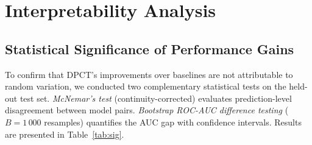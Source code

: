 \documentclass[conference,12pt]{IEEEtran}
\newcommand{\dpct}{\textsc{DPCT}}
\newcommand{\tab}[1]{Table~\ref{#1}}
\begin{document}
\begin{table}[!t]
  \centering
  \caption{Ablation Study on DPCT Architectural Components (5-Fold CV Mean)}
  \label{tab:ablation}
  \small
  \renewcommand{\arraystretch}{1.1}
\end{table}

\section{\textbf{Interpretability Analysis}}
\label{sec:interp}

\subsection{\textbf{Statistical Significance of Performance Gains}}
\label{sec:interp:sig}

To confirm that \dpct{}'s improvements over baselines are not attributable to
random variation, we conducted two complementary statistical tests on the
held-out test set.
\emph{McNemar's test} (continuity-corrected) evaluates prediction-level
disagreement between model pairs.
\emph{Bootstrap ROC-AUC difference testing} ($B = 1\,000$ resamples) quantifies
the AUC gap with confidence intervals.
Results are presented in \tab{tab:sig}.
\end{document}
